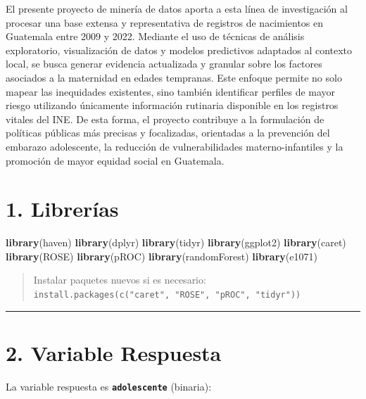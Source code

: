 \documentclass[
]{article}
\newenvironment{Shaded}{\begin{snugshade}}{\end{snugshade}}
\newcommand{\FunctionTok}[1]{\textcolor[rgb]{0.13,0.29,0.53}{\textbf{#1}}}
\newcommand{\NormalTok}[1]{#1}
\begin{document}
El presente proyecto de minería de datos aporta a esta línea de
investigación al procesar una base extensa y representativa de registros
de nacimientos en Guatemala entre 2009 y 2022. Mediante el uso de
técnicas de análisis exploratorio, visualización de datos y modelos
predictivos adaptados al contexto local, se busca generar evidencia
actualizada y granular sobre los factores asociados a la maternidad en
edades tempranas. Este enfoque permite no solo mapear las inequidades
existentes, sino también identificar perfiles de mayor riesgo utilizando
únicamente información rutinaria disponible en los registros vitales del
INE. De esta forma, el proyecto contribuye a la formulación de políticas
públicas más precisas y focalizadas, orientadas a la prevención del
embarazo adolescente, la reducción de vulnerabilidades
materno-infantiles y la promoción de mayor equidad social en Guatemala.

\section{1. Librerías}\label{libreruxedas}

\begin{Shaded}
\begin{Highlighting}[]
\FunctionTok{library}\NormalTok{(haven)}
\FunctionTok{library}\NormalTok{(dplyr)}
\FunctionTok{library}\NormalTok{(tidyr)}
\FunctionTok{library}\NormalTok{(ggplot2)}
\FunctionTok{library}\NormalTok{(caret)}
\FunctionTok{library}\NormalTok{(ROSE)}
\FunctionTok{library}\NormalTok{(pROC)}
\FunctionTok{library}\NormalTok{(randomForest)}
\FunctionTok{library}\NormalTok{(e1071)}
\end{Highlighting}
\end{Shaded}

\begin{quote}
Instalar paquetes nuevos si es necesario:
\texttt{install.packages(c("caret",\ "ROSE",\ "pROC",\ "tidyr"))}
\end{quote}

\begin{center}\rule{0.5\linewidth}{0.5pt}\end{center}

\section{2. Variable Respuesta}\label{variable-respuesta}

La variable respuesta es \textbf{\texttt{adolescente}} (binaria):
\end{document}
